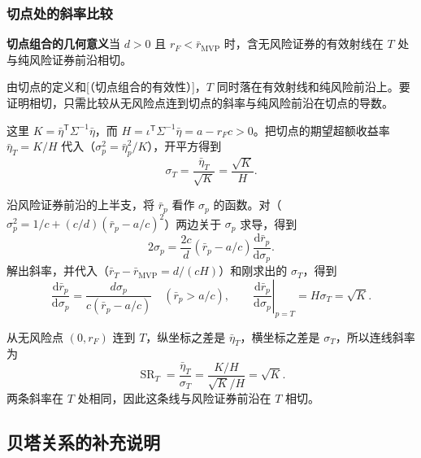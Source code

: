 \subsubsection*{切点处的斜率比较}
\label{proof:wj-twelve-tangency-geometry}
\begin{tcolorbox}[knowledge]
\textbf{切点组合的几何意义}\quad 当 $d>0$ 且 $r_F<\bar r_{\mathrm{MVP}}$ 时，含无风险证券的有效射线在 $T$ 处与纯风险证券前沿相切。
\end{tcolorbox}

由切点的定义和[（切点组合的有效性）]，$T$ 同时落在有效射线和纯风险前沿上。要证明相切，只需比较从无风险点连到切点的斜率与纯风险前沿在切点的导数。

\begin{solution}[label-content={证明},blank-type=none]
这里 $K=\bar\eta^{\mathsf T}\Sigma^{-1}\bar\eta$，而 $H=\iota^{\mathsf T}\Sigma^{-1}\bar\eta=a-r_Fc>0$。把切点的期望超额收益率 $\bar\eta_T=K/H$ 代入（$\sigma_p^2=\bar\eta_p^2/K$），开平方得到
\[
 \sigma_T=\frac{\bar\eta_T}{\sqrt K}=\frac{\sqrt K}{H}.
\]

沿风险证券前沿的上半支，将 $\bar r_p$ 看作 $\sigma_p$ 的函数。对（$\sigma_p^2=1/c+(c/d)(\bar r_p-a/c)^2$）两边关于 $\sigma_p$ 求导，得到
\[
 2\sigma_p=\frac{2c}{d}(\bar r_p-a/c)\frac{\mathrm d\bar r_p}{\mathrm d\sigma_p}.
\]
解出斜率，并代入（$\bar r_T-\bar r_{\mathrm{MVP}}=d/(cH)$）和刚求出的 $\sigma_T$，得到
\[
 \frac{\mathrm d\bar r_p}{\mathrm d\sigma_p}
 =\frac{d\sigma_p}{c(\bar r_p-a/c)}\quad(\bar r_p>a/c),\qquad
 \left.\frac{\mathrm d\bar r_p}{\mathrm d\sigma_p}\right|_{p=T}
 =H\sigma_T=\sqrt K.
\]

从无风险点 $(0,r_F)$ 连到 $T$，纵坐标之差是 $\bar\eta_T$，横坐标之差是 $\sigma_T$，所以连线斜率为
\[
 \operatorname{SR}_T=\frac{\bar\eta_T}{\sigma_T}
 =\frac{K/H}{\sqrt K/H}=\sqrt K.
\]
两条斜率在 $T$ 处相同，因此这条线与风险证券前沿在 $T$ 相切。
\end{solution}


\subsection*{贝塔关系的补充说明}
\label{supp:wj-twelve-beta}

